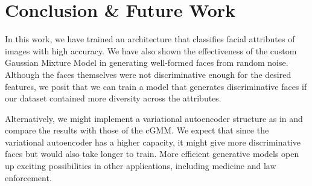 \documentclass[10pt,twocolumn,letterpaper]{article}
\begin{document}



\section{Conclusion \& Future Work}
In this work, we have trained an architecture that classifies facial attributes of images with high accuracy. We have also shown the effectiveness of the custom Gaussian Mixture Model in generating well-formed faces from random noise. 
Although the faces themselves were not discriminative enough for the desired features, we posit that we can train a model that generates discriminative faces if our dataset contained more diversity across the attributes.

Alternatively, we might implement a variational autoencoder structure as in \cite{gregor2015draw} and compare the results with those of the cGMM. We expect that since the variational autoencoder has a higher capacity, it might give more discriminative faces but would also take longer to train. More efficient generative models open up exciting possibilities in other applications, including medicine and law enforcement. 

\newpage
\nocite{*}
{\small


}
\end{document}
